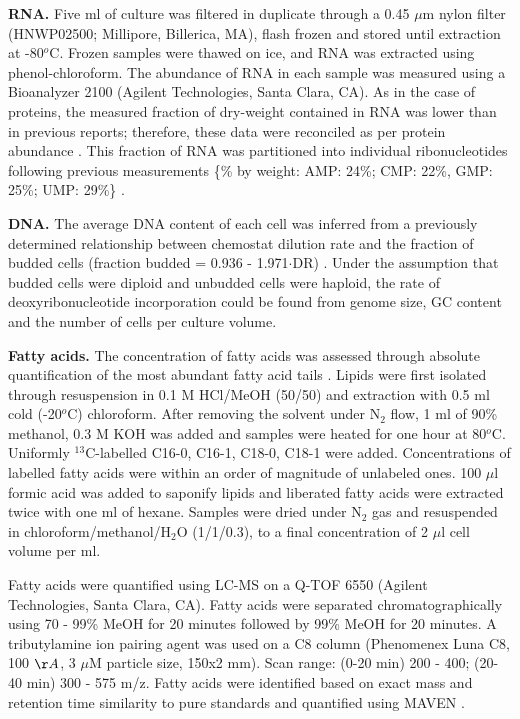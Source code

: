 \documentclass[12pt]{nature}\usepackage{graphicx, color}
\begin{document}
\textbf{RNA.} Five ml of culture was filtered in duplicate through a 0.45 $\mu$m nylon filter (HNWP02500; Millipore, Billerica, MA), flash frozen and stored until extraction at -80$^{o}$C.  Frozen samples were thawed on ice, and RNA was extracted using phenol-chloroform.  The abundance of RNA in each sample was measured using a Bioanalyzer 2100 (Agilent Technologies, Santa Clara, CA).  As in the case of proteins, the measured fraction of dry-weight contained in RNA was lower than in previous reports; therefore, these data were reconciled as per protein abundance \cite{Schulze:1995uv, Lange:2001th}. This fraction of RNA was partitioned into individual ribonucleotides following previous measurements \{\% by weight: AMP: 24\%; CMP: 22\%, GMP: 25\%; UMP: 29\%\} \cite{Herrgard:2008gb}.

\textbf{DNA.} The average DNA content of each cell was inferred from a previously determined relationship between chemostat dilution rate and the fraction of budded cells (fraction budded = 0.936 - 1.971$\cdot$DR) \cite{main-Brauer:2008jn}.  Under the assumption that budded cells were diploid and unbudded cells were haploid, the rate of deoxyribonucleotide incorporation could be found from genome size, GC content and the number of cells per culture volume.

\textbf{Fatty acids.} The concentration of fatty acids was assessed through absolute quantification of the most abundant fatty acid tails \cite{Pramanik:1997ja}.  Lipids were first isolated through resuspension in 0.1 M HCl/MeOH (50/50) and extraction with 0.5 ml cold (-20$^{o}$C) chloroform.  After removing the solvent under N$_{2}$ flow, 1 ml of 90\% methanol, 0.3 M KOH was added and samples were heated for one hour at 80$^{o}$C.  Uniformly $^{13}$C-labelled C16-0, C16-1, C18-0, C18-1 were added.  Concentrations of labelled fatty acids were within an order of magnitude of unlabeled ones.  100 $\mu$l formic acid was added to saponify lipids and liberated fatty acids were extracted twice with one ml of hexane.  Samples were dried under N$_{2}$ gas and resuspended in chloroform/methanol/H$_{2}$O (1/1/0.3), to a final concentration of 2 $\mu$l cell volume per ml.

Fatty acids were quantified using LC-MS on a Q-TOF 6550 (Agilent Technologies, Santa Clara, CA).  Fatty acids were separated chromatographically using 70 - 99\% MeOH for 20 minutes followed by 99\% MeOH for 20 minutes.  A tributylamine ion pairing agent was used on a C8 column (Phenomenex Luna C8, 100 $\AA$, 3 $\mu$M particle size, 150x2 mm).  Scan range: (0-20 min) 200 - 400; (20-40 min) 300 - 575 m/z.  Fatty acids were identified based on exact mass and retention time similarity to pure standards and quantified using MAVEN \cite{Melamud:2010bp}.  
\end{document}
